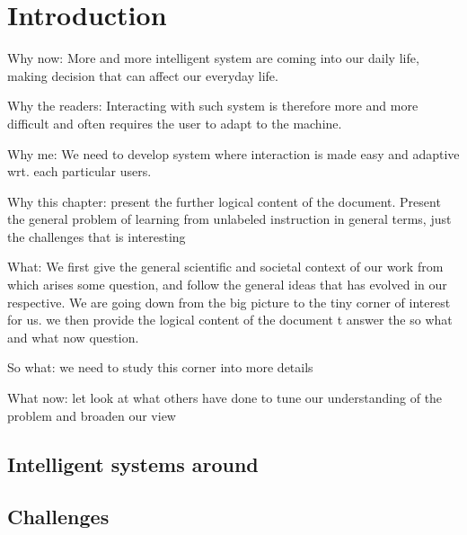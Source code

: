 \renewcommand{\chapterpath}{\allchapterspath/introduction}
\renewcommand{\imgpath}{\chapterpath/img}

\chapter{Introduction}
\label{chapter:introduction}
\minitoc

Why now: More and more intelligent system are coming into our daily life, making decision that can affect our everyday life. 

Why the readers: Interacting with such system is therefore more and more difficult and often requires the user to adapt to the machine.

Why me: We need to develop system where interaction is made easy and adaptive wrt. each particular users. 

Why this chapter: present the further logical content of the document. Present the general problem of learning from unlabeled instruction in general terms, just the challenges that is interesting 

What: We first give the general scientific and societal context of our work from which arises some question, and follow the general ideas that has evolved in our respective. We are going down from the big picture to the tiny corner of interest for us. we then provide the logical content of the document t answer the so what and what now question.

So what: we need to study this corner into more details

What now: let look at what others have done to tune our understanding of the problem and broaden our view

\section{Intelligent systems around}


\section{Challenges}

